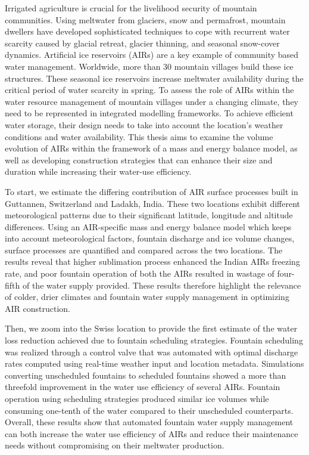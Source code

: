 %
\label{sec:abstract}

Irrigated agriculture is crucial for the livelihood security of mountain communities. Using meltwater from
glaciers, snow and permafrost, mountain dwellers have developed sophisticated techniques to cope with recurrent
water scarcity caused by glacial retreat, glacier thinning, and seasonal snow-cover dynamics. Artificial ice
reservoirs (AIRs) are a key example of community based water management. Worldwide, more than 30 mountain
villages build these ice structures. These seasonal ice reservoirs increase meltwater availability during the
critical period of water scarcity in spring. To assess the role of AIRs within the water resource management of
mountain villages under a changing climate, they need to be represented in integrated modelling frameworks. To
achieve efficient water storage, their design needs to take into account the location's weather conditions and
water availability. This thesis aims to examine the volume evolution of AIRs within the framework of a mass and
energy balance model, as well as developing construction strategies that can enhance their size and duration
while increasing their water-use efficiency. 

To start, we estimate the differing contribution of AIR surface processes built in Guttannen, Switzerland and
Ladakh, India. These two locations exhibit different meteorological patterns due to their significant latitude,
longitude and altitude differences. Using an AIR-specific mass and energy balance model which keeps into account
meteorological factors, fountain discharge and ice volume changes, surface processes are quantified and compared
across the two locations. The results reveal that higher sublimation process enhanced the Indian AIRs freezing
rate, and poor fountain operation of both the AIRs resulted in wastage of four-fifth of the water supply
provided. These results therefore highlight the relevance of colder, drier climates and fountain water supply
management in optimizing  AIR construction.  

Then, we zoom into the Swiss location to provide the first estimate of the water loss reduction achieved due to
fountain scheduling strategies. Fountain scheduling was realized through a control valve that was automated with
optimal discharge rates computed using real-time weather input and location metadata. Simulations converting
unscheduled fountains to scheduled fountains showed a more than threefold improvement in the water use
efficiency of several AIRs. Fountain operation using scheduling strategies produced similar ice volumes while
consuming one-tenth of the water compared to their unscheduled counterparts.  Overall, these results show that
automated fountain water supply management can both increase the water use efficiency of AIRs and reduce their
maintenance needs without compromising on their meltwater production.

